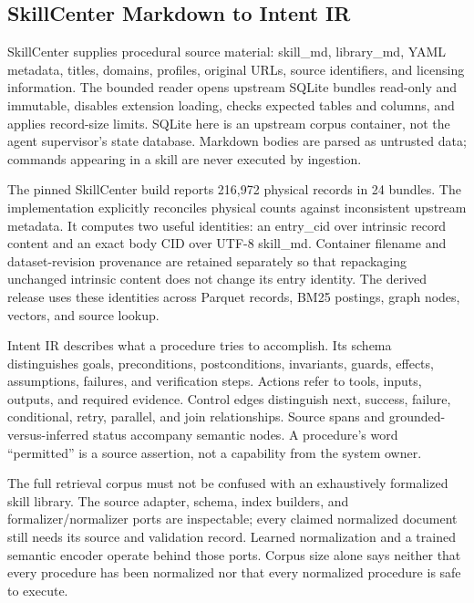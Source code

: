 \documentclass{article}
\begin{document}
\subsection{SkillCenter Markdown to Intent IR}

SkillCenter supplies procedural source material: skill\_\allowbreak{}md, library\_\allowbreak{}md, YAML metadata, titles, domains, profiles, original URLs, source identifiers, and licensing information. The bounded reader opens upstream SQLite bundles read-only and immutable, disables extension loading, checks expected tables and columns, and applies record-size limits. SQLite here is an upstream corpus container, not the agent supervisor's state database. Markdown bodies are parsed as untrusted data; commands appearing in a skill are never executed by ingestion.

The pinned SkillCenter build reports 216,972 physical records in 24 bundles. The implementation explicitly reconciles physical counts against inconsistent upstream metadata. It computes two useful identities: an entry\_\allowbreak{}cid over intrinsic record content and an exact body CID over UTF-8 skill\_\allowbreak{}md. Container filename and dataset-revision provenance are retained separately so that repackaging unchanged intrinsic content does not change its entry identity. The derived release uses these identities across Parquet records, BM25 postings, graph nodes, vectors, and source lookup.

Intent IR describes what a procedure tries to accomplish. Its schema distinguishes goals, preconditions, postconditions, invariants, guards, effects, assumptions, failures, and verification steps. Actions refer to tools, inputs, outputs, and required evidence. Control edges distinguish next, success, failure, conditional, retry, parallel, and join relationships. Source spans and grounded-versus-inferred status accompany semantic nodes. A procedure's word ``permitted'' is a source assertion, not a capability from the system owner.

The full retrieval corpus must not be confused with an exhaustively formalized skill library. The source adapter, schema, index builders, and formalizer/normalizer ports are inspectable; every claimed normalized document still needs its source and validation record. Learned normalization and a trained semantic encoder operate behind those ports. Corpus size alone says neither that every procedure has been normalized nor that every normalized procedure is safe to execute.
\end{document}
